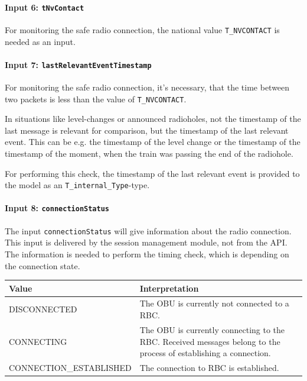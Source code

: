 \paragraph{Input 6: \texttt{tNvContact}}

For monitoring the safe radio connection, the national value \texttt{T\_NVCONTACT} is needed as an input.

\paragraph{Input 7: \texttt{lastRelevantEventTimestamp}}

For monitoring the safe radio connection, it's necessary, that the time between two packets is less than the value of \texttt{T\_NVCONTACT}.

In situations like level-changes or announced radioholes, not the timestamp of the last message is relevant for comparison, but the timestamp of the last relevant event. This can be e.g. the timestamp of the level change or the timestamp of the timestamp of the moment, when the train was passing the end of the radiohole. 

For performing this check, the timestamp of the last relevant event is provided to the model as an \texttt{T\_internal\_Type}-type.

\paragraph{Input 8: \texttt{connectionStatus}\\}
The input \texttt{connectionStatus} will give information about the radio connection. This input is delivered by the session management module, not from the API. The information is needed to perform the timing check, which is depending on the connection state.

\begin{minipage}{\linewidth}
  \begin{tabular}{| l | p{9cm} |}
    \hline
    \textbf{Value} & \textbf{Interpretation}\\ \hline
    DISCONNECTED & The OBU is currently not connected to a RBC.\\
    CONNECTING & The OBU is currently connecting to the RBC. Received messages belong to the process of establishing a connection.\\
    CONNECTION\_ESTABLISHED &  The connection to RBC is established.\\
    \hline
  \end{tabular} 
  \label{tbl:connectionStatus}
\end{minipage}

